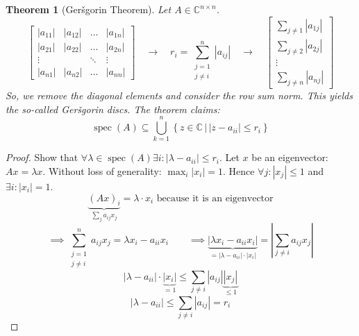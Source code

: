 \documentclass[a4paper]{article}
\newcounter{lecref}[section]
\numberwithin{lecref}{section}
\newtheorem{theorem}[lecref]{Theorem}
\newcommand{\setdef}[2]{\left\{\left.#1\,\right|\,#2\right\}}
\newcommand{\card}[1]{\left|#1\right|}
\begin{document}
\begin{theorem}[Ger\v{s}gorin Theorem] %
  Let $A \in \mathbb C^{n \times n}$.
  \[
    \begin{bmatrix}
      \card{a_{11}} & \card{a_{12}} & \dots  & \card{a_{1n}} \\
      \card{a_{21}} & \card{a_{22}} & \dots  & \card{a_{2n}} \\
      \vdots        &               & \ddots & \vdots \\
      \card{a_{n1}} & \card{a_{n2}} & \dots  & \card{a_{nn}}
    \end{bmatrix}
    \quad \to \quad
    r_i = \sum_{\substack{j=1 \\ j\neq i}}^n \card{a_{ij}}
    \quad \to \quad
    \begin{bmatrix}
      \sum_{j\neq 1} \card{a_{1j}} \\
      \sum_{j\neq 2} \card{a_{2j}} \\
      \vdots \\
      \sum_{j\neq n} \card{a_{nj}}
    \end{bmatrix}
  \]
  So, we remove the diagonal elements and consider the row sum norm.
  This yields the so-called \emph{Ger\v{s}gorin discs}.
  The theorem claims:
  \[
    \operatorname{spec}(A) \subseteq \bigcup_{k=1}^n \setdef{z \in \mathbb C}{\card{z - a_{ii}} \leq r_{i}}
  \]
\end{theorem}

\begin{proof}
  Show that $\forall \lambda \in \operatorname{spec}(A) \exists i: \card{\lambda - a_{ii}} \leq r_i$.
  Let $x$ be an eigenvector: $Ax = \lambda x$.
  Without loss of generality: $\max_i \card{x_i} = 1$.
  Hence $\forall j: \card{x_j} \leq 1$ and $\exists i: \card{x_i} = 1$.
  \[ \underbrace{(Ax)_i}_{\sum_j a_{ij} x_j} = \lambda \cdot x_i \text{ because it is an eigenvector} \]
  \[ \implies \sum_{\substack{j = 1 \\ j \neq i}}^n a_{ij} x_j = \lambda x_i - a_{ii} x_i \qquad
     \implies \underbrace{\card{\lambda x_i - a_{ii} x_i}}_{= \card{\lambda - a_{ii}} \cdot \card{x_i}} = \card{\sum_{j \neq i} a_{ij} x_j} \]
  \[ \card{\lambda - a_{ii}} \cdot \underbrace{\card{x_i}}_{=1} \leq \sum_{j \neq i} \card{a_{ij}} \underbrace{\card{x_j}}_{\leq 1} \]
  \[ \card{\lambda - a_{ii}} \leq \sum_{j \neq i} \card{a_{ij}} = r_i \]
\end{proof}
\end{document}
